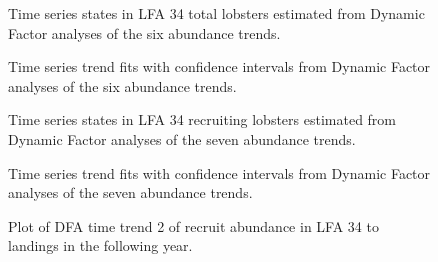 \documentclass[11pt]{article}
\newcommand{\e}{/SpinDr/backup/bio_data/bio.lobster/figures/LFA3438Framework2019/} %
\begin{document}
   \begin{figure}
    \centering
        \caption{Time series states in LFA 34 total lobsters estimated from Dynamic Factor analyses of the six abundance trends.}

    \end{figure}

\begin{figure}
    \centering
        \caption{Time series trend fits with confidence intervals from Dynamic Factor analyses of the six abundance trends.}

    \end{figure}


   \begin{figure}
    \centering
        \caption{Time series states in LFA 34 recruiting lobsters estimated from Dynamic Factor analyses of the seven abundance trends.}

    \end{figure}

\begin{figure}
    \centering
        \caption{Time series trend fits with confidence intervals from Dynamic Factor analyses of the seven abundance trends.}

    \end{figure}

\begin{figure}
    \centering
        \caption{Plot of DFA time trend 2 of recruit abundance in LFA 34 to landings in the following year.}

    \end{figure}

    
\end{document}
